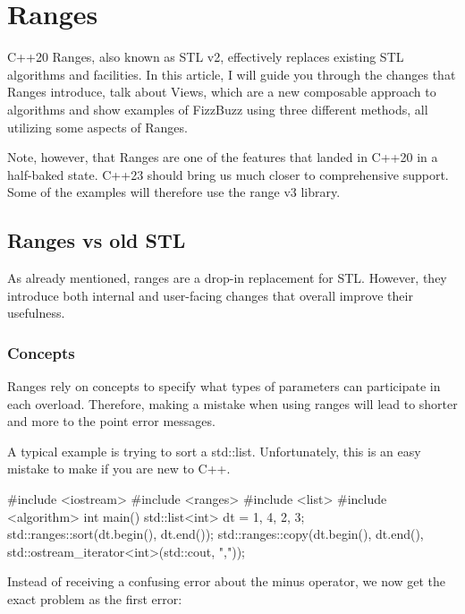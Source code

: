 \chapter{ Ranges}

C++20 Ranges, also known as STL v2, effectively replaces existing STL algorithms and facilities. In this article, I will guide you through the changes that Ranges introduce, talk about Views, which are a new composable approach to algorithms and show examples of FizzBuzz using three different methods, all utilizing some aspects of Ranges.

Note, however, that Ranges are one of the features that landed in C++20 in a half-baked state. C++23 should bring us much closer to comprehensive support. Some of the examples will therefore use the range v3 library.

\section{Ranges vs old STL}

As already mentioned, ranges are a drop-in replacement for STL. However, they introduce both internal and user-facing changes that overall improve their usefulness.

\subsection{Concepts}

Ranges rely on concepts to specify what types of parameters can participate in each overload. Therefore, making a mistake when using ranges will lead to shorter and more to the point error messages.

A typical example is trying to sort a std::list. Unfortunately, this is an easy mistake to make if you are new to C++.

\begin{box-note}
\begin{cppcode}
#include <iostream>
#include <ranges>
#include <list>
#include <algorithm>
int main() {
    std::list<int> dt = {1, 4, 2, 3};
    std::ranges::sort(dt.begin(), dt.end());
    std::ranges::copy(dt.begin(), dt.end(), 
        std::ostream_iterator<int>(std::cout, ","));
}
\end{cppcode}
\end{box-note}

Instead of receiving a confusing error about the minus operator, we now get the exact problem as the first error:

